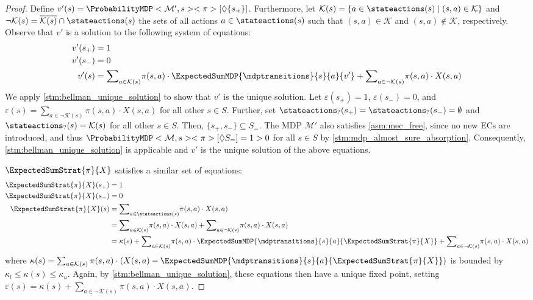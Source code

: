 \documentclass{article}
\newcommand{\intersectionSym}{\cap}
\newcommand{\intersectionBin}{\mathbin{\intersectionSym}}
\newcommand{\intersection}{\intersectionBin}
\newcommand{\MDP}{\mathcal{M}}
\newcommand{\States}{S}
\newcommand{\strategy}{\pi}
\newcommand{\reach}{\Diamond}
\newcommand{\targetstate}{s_+}
\newcommand{\sinkstate}{s_-}
\begin{document}
\begin{proof}
	Define $v'(s) = \ProbabilityMDP<\MDP', s><\strategy>[\reach \{\targetstate\}]$.
	Furthermore, let $\mathcal{K}(s) = \{a \in \stateactions(s) \mid (s, a) \in \mathcal{K}\}$ and $\lnot \mathcal{K}(s) = \overline{\mathcal{K}(s)} \intersection \stateactions(s)$ the sets of all actions $a \in \stateactions(s)$ such that $(s, a) \in \mathcal{K}$ and $(s, a) \notin \mathcal{K}$, respectively.
	Observe that $v'$ is a solution to the following system of equations:
	\begin{align*}
		v'(\targetstate) & = 1 \\
		v'(\sinkstate) & = 0 \\
		v'(s) & = {\sum}_{a \in \mathcal{K}(s)} \strategy(s, a) \cdot \ExpectedSumMDP{\mdptransitions}{s}{a}{v'} + {\sum}_{a \in \lnot \mathcal{K}(s)} \strategy(s, a) \cdot X(s, a)
	\end{align*}
	We apply \cref{stm:bellman_unique_solution} to show that $v'$ is the unique solution.
	Let $\varepsilon(\targetstate) = 1$, $\varepsilon(\sinkstate) = 0$, and $\varepsilon(s) = {\sum}_{a \in \lnot \mathcal{K}(s)} \strategy(s, a) \cdot X(s, a)$ for all other $s \in \States$.
	Further, set $\stateactions_?(\targetstate) = \stateactions_?(\sinkstate) = \emptyset$ and $\stateactions_?(s) = \mathcal{K}(s)$ for all other $s \in \States$.
	Then, $\{\targetstate, \sinkstate\} \subseteq \States_=$.
	The MDP $\MDP'$ also satisfies \cref{asm:mec_free}, since no new ECs are introduced, and thus $\ProbabilityMDP<\MDP, s><\strategy>[\reach \States_=] = 1 > 0$ for all $s \in \States$ by \cref{stm:mdp_almost_sure_absorption}.
	Consequently, \cref{stm:bellman_unique_solution} is applicable and $v'$ is the unique solution of the above equations.

	$\ExpectedSumStrat{\strategy}{X}$ satisfies a similar set of equations:
	\begin{align*}
		\ExpectedSumStrat{\strategy}{X}(\targetstate) & = 1 \\
		\ExpectedSumStrat{\strategy}{X}(\sinkstate) & = 0 \\
		\ExpectedSumStrat{\strategy}{X}(s) & = {\sum}_{a \in \stateactions(s)} \strategy(s, a) \cdot X(s, a) \\
			& = {\sum}_{a \in \mathcal{K}(s)} \strategy(s, a) \cdot X(s, a) + {\sum}_{a \in \lnot \mathcal{K}(s)} \strategy(s, a) \cdot X(s, a) \\
			& = \kappa(s) + {\sum}_{a \in \mathcal{K}(s)} \strategy(s, a) \cdot \ExpectedSumMDP{\mdptransitions}{s}{a}{\ExpectedSumStrat{\strategy}{X}} + {\sum}_{a \in \lnot \mathcal{K}(s)} \strategy(s, a) \cdot X(s, a)
	\end{align*}
	where $\kappa(s) = \sum_{a \in \mathcal{K}(s)} \strategy(s, a) \cdot (X(s, a) - \ExpectedSumMDP{\mdptransitions}{s}{a}{\ExpectedSumStrat{\strategy}{X}})$ is bounded by $\kappa_l \leq \kappa(s) \leq \kappa_u$.
	Again, by \cref{stm:bellman_unique_solution}, these equations then have a unique fixed point, setting $\varepsilon(s) = \kappa(s) + {\sum}_{a \in \lnot \mathcal{K}(s)} \strategy(s, a) \cdot X(s, a)$.


\end{proof}
\end{document}
